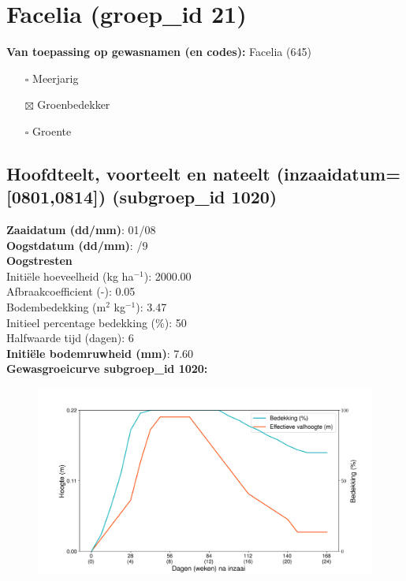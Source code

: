\documentclass{article}
\begin{document}
 \section{Facelia (groep\_id 21)} 
 \textbf{Van toepassing op gewasnamen (en codes):} Facelia (645) 
 \begin{multicols}{3} \begin{itemize} \item[$\square$] Meerjarig \item[$\boxtimes$] Groenbedekker \item[$\square$] Groente \end{itemize} \end{multicols} 
 \subsection{Hoofdteelt, voorteelt en nateelt (inzaaidatum=[0801,0814]) (subgroep\_id 1020)} 
  \textbf{Zaaidatum (dd/mm)}: 01/08  \vspace{0.10cm} \\ 
  \textbf{Oogstdatum (dd/mm)}: /9  \vspace{0.10cm} \\ 
  \textbf{Oogstresten} \vspace{0.05cm} \\ 
  \tab Initi\"{e}le hoeveelheid (kg ha$^{-1}$): 2000.00 \vspace{0.05cm} \\ 
  \tab Afbraakcoefficient (-): 0.05 \vspace{0.05cm} \\ 
  \tab Bodembedekking (m$^2$ kg$^{-1}$): 3.47 \vspace{0.05cm} \\ 
  \tab Initieel percentage bedekking (\%): 50 \vspace{0.05cm} \\ 
  \tab Halfwaarde tijd (dagen): 6 \vspace{0.05cm} \\ 
  \textbf{Initi\"{e}le bodemruwheid (mm)}: 7.60 \vspace{0.05cm} \\ 
  \textbf{Gewasgroeicurve subgroep\_id 1020:} 
 \begin{center} \begin{figure}[H] \includegraphics[width=12.5cm]{temp/1020.png} \end{figure} \end{center} 
\end{document}
